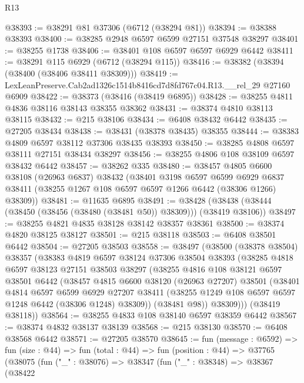 \begin{lexlean}{R13}
\begin{coremodule}
@38393 := @38291 @81 @37306 (@6712 (@38294 @81))
@38394 := @38388 @38393
@38400 := @38285 @2948 @6597 @6599 @27151 @37548 @38297
@38401 := @38255 @1738
@38406 := @38401 @108 @6597 @6597 @6929 @6442
@38411 := @38291 @115 @6929 (@6712 (@38294 @115))
@38416 := @38382 (@38394 (@38400 (@38406 @38411 @38309)))
@38419 := LexLeanPreserve.Cab2ad1326c1514b8416cd7d8fd767c04.R13.__rel_29 @27160 @6909
@38422 := @38373 (@38416 (@38419 @6895))
@38428 := @38255 @4811 @4836 @38116 @38143 @38355 @38362
@38431 := @38374 @4810 @38113 @38115
@38432 := @215 @38106
@38434 := @6408 @38432 @6442
@38435 := @27205 @38434
@38438 := @38431 (@38378 @38435) @38355
@38444 := @38383 @4809 @6597 @38112 @37306 @38435 @38393
@38450 := @38285 @4808 @6597 @38111 @27151 @38434 @38297
@38456 := @38255 @4806 @108 @38109 @6597 @38432 @6442
@38457 := @38262 @335
@38480 := @38457
    @4805
    @6600
    @38108
    (@26963 @6837)
    @38432
    (@38401
      @3198
      @6597
      @6599
      @6929
      @6837
      @38411
      (@38255 @1267 @108 @6597 @6597 @1266 @6442 (@38306 @1266) @38309))
@38481 := @11635 @6895
@38491 := @38428 (@38438 (@38444 (@38450 (@38456 (@38480 (@38481 @50)) @38309))) (@38419 @38106))
@38497 := @38255 @4821 @4835 @38128 @38142 @38357 @38361
@38500 := @38374 @4820 @38125 @38127
@38501 := @215 @38118
@38503 := @6408 @38501 @6442
@38504 := @27205 @38503
@38558 := @38497
    (@38500
      (@38378 @38504)
      @38357
      (@38383
        @4819
        @6597
        @38124
        @37306
        @38504
        @38393
        (@38285
          @4818
          @6597
          @38123
          @27151
          @38503
          @38297
          (@38255
            @4816
            @108
            @38121
            @6597
            @38501
            @6442
            (@38457
              @4815
              @6600
              @38120
              (@26963 @27207)
              @38501
              (@38401
                @4814
                @6597
                @6599
                @6929
                @27207
                @38411
                (@38255 @1249 @108 @6597 @6597 @1248 @6442 (@38306 @1248) @38309))
              (@38481 @98))
            @38309)))
      (@38419 @38118))
@38564 := @38255 @4833 @108 @38140 @6597 @38359 @6442
@38567 := @38374 @4832 @38137 @38139
@38568 := @215 @38130
@38570 := @6408 @38568 @6442
@38571 := @27205 @38570
@38645 := fun (message : @6592) =>
  fun (size : @44) =>
  fun (total : @44) =>
  fun (position : @44) =>
  @37765
    (@38075
      (fun ("_" : @38076) =>
      @38347
        (fun ("_" : @38348) =>
        @38367
          (@38422

\end{coremodule}
\end{lexlean}
